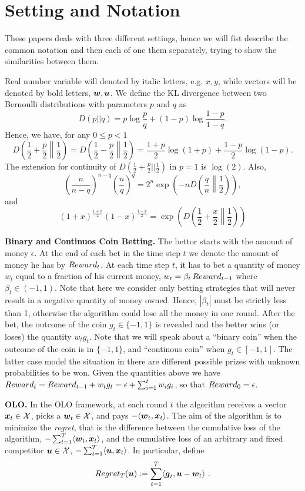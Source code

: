 \section{Setting and Notation}
These papers deals with three different settings, hence we will fist describe the common notation and then each of one them separately, trying to show the similarities between them.

Real number variable will denoted by italic letters, e.g. $x,y$, while vectors will be denoted by bold letters, $\boldsymbol{w},\boldsymbol{u}$.
We define the KL divergence between two Bernoulli distributions with parameters $p$ and $q$ as
\[
D(p||q)= p \log\frac{p}{q} + (1-p) \log\frac{1-p}{1-q}.
\]
Hence, we have, for any $ 0\leq p < 1$
\[
D\left(\frac{1}{2}+\frac{p}{2}\middle\|\frac{1}{2}\right) = D\left(\frac{1}{2}-\frac{p}{2}\middle\|\frac{1}{2}\right)= \frac{1+p}{2} \log(1+p) + \frac{1-p}{2} \log(1-p).
\]
The extension for continuity of $D(\frac{1}{2}+\frac{p}{2}||\frac{1}{2})$ in $p=1$ is $\log(2)$.
Also,
\[
\left(\frac{n}{n-q}\right)^{n-q} \left(\frac{n}{q}\right)^{q} = 2^n \exp\left(-n D\left(\frac{q}{n}\middle\|\frac{1}{2}\right)\right),
\]
and
\[
\left(1+x\right)^\frac{1+x}{2} \left(1-x\right)^\frac{1-x}{2}= \exp\left( D\left(\frac{1}{2}+\frac{x}{2}\middle\|\frac{1}{2}\right) \right)
\]

\textbf{Binary and Continuos Coin Betting.}
The bettor starts with the amount of money $\epsilon$. 
At the end of each bet in the time step $t$ we denote the amount of money he has by $Reward_t$.
At each time step $t$, it has to bet a quantity of money $w_t$ equal to a fraction of his current money, $w_t=\beta_t \, Reward_{t-1}$ where $\beta_t \in (-1,1)$. Note that here we consider only betting strategies that will never result in a negative quantity of money owned. Hence, $|\beta_t|$ must be strictly less than 1, otherwise the algorithm could lose all the money in one round.
After the bet, the outcome of the coin $g_t \in \{-1,1\}$ is revealed and the better wins (or loses) the quantity $w_t g_t$.
Note that we will speak about a ``binary coin'' when the outcome of the coin is in $\{-1,1\}$, and ``continous coin'' when $g_t \in [-1,1]$. The latter case model the situation in there are different possible prizes with unknown probabilities to be won. Given the quantities above we have $Reward_t=Reward_{t-1} + w_t g_t = \epsilon + \sum_{i=1}^t w_i g_i$, so that $Reward_0=\epsilon$.

\textbf{\ac{OLO}.}
In the \ac{OLO} framework, at each round $t$ the algorithm receives a vector $\boldsymbol{x}_t \in \mathcal{X}$, picks a $\boldsymbol{w}_t \in \mathcal{X}$, and pays $-\langle \boldsymbol{w}_t,\boldsymbol{x}_t \rangle$.
The aim of the algorithm is to minimize the \emph{regret}, that is the difference between the cumulative loss of the algorithm, $-\sum_{t=1}^T \langle \boldsymbol{w}_t,\boldsymbol{x}_t \rangle$, and the cumulative loss of an arbitrary and fixed competitor $\boldsymbol{u} \in \mathcal{X}$, $-\sum_{t=1}^T \langle \boldsymbol{u},\boldsymbol{x}_t \rangle$.
In particular, define
\[
Regret_T(\boldsymbol{u}) := \sum_{t=1}^T \langle \boldsymbol{g}_t , \boldsymbol{u} - \boldsymbol{w}_t \rangle~.
\]


